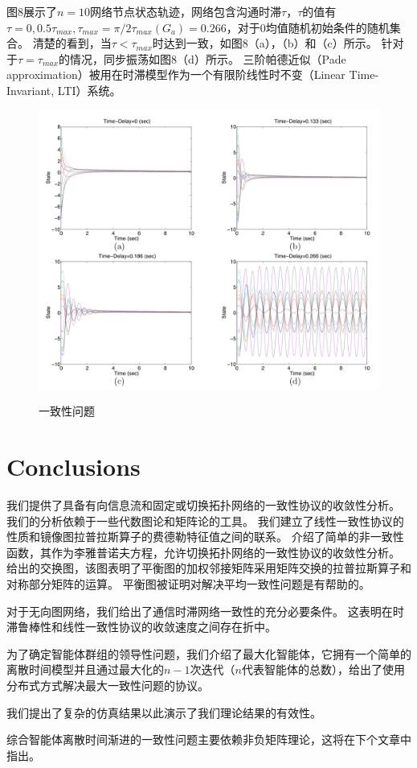 \documentclass{article}
\begin{document}
图8展示了$n=10$网络节点状态轨迹，网络包含沟通时滞$\tau$，$\tau$的值有$\tau=0, 0.5\tau_{max}, \tau_{max} = \pi / 2\tau_{max}(G_a) = 0.266$，对于0均值随机初始条件的随机集合。
清楚的看到，当$\tau < \tau_{max}$时达到一致，如图8（a），（b）和（c）所示。
针对于$\tau = \tau_{max}$的情况，同步振荡如图8（d）所示。
三阶帕德近似（Pade approximation）被用在时滞模型作为一个有限阶线性时不变（Linear Time-Invariant, LTI）系统。
\begin{figure}[htbp]
    \centering
    \includegraphics[width=14.5cm]{figures/Fig8-ConsensusProblem.jpeg}
    \label{ConsensusProblem}
    \caption{一致性问题}
\end{figure}


\section{Conclusions}
我们提供了具备有向信息流和固定或切换拓扑网络的一致性协议的收敛性分析。
我们的分析依赖于一些代数图论和矩阵论的工具。
我们建立了线性一致性协议的性质和镜像图拉普拉斯算子的费德勒特征值之间的联系。
介绍了简单的非一致性函数，其作为李雅普诺夫方程，允许切换拓扑网络的一致性协议的收敛性分析。
给出的交换图，该图表明了平衡图的加权邻接矩阵采用矩阵交换的拉普拉斯算子和对称部分矩阵的运算。
平衡图被证明对解决平均一致性问题是有帮助的。

对于无向图网络，我们给出了通信时滞网络一致性的充分必要条件。
这表明在时滞鲁棒性和线性一致性协议的收敛速度之间存在折中。

为了确定智能体群组的领导性问题，我们介绍了最大化智能体，它拥有一个简单的离散时间模型并且通过最大化的$n-1$次迭代（$n$代表智能体的总数），给出了使用分布式方式解决最大一致性问题的协议。

我们提出了复杂的仿真结果以此演示了我们理论结果的有效性。

综合智能体离散时间渐进的一致性问题主要依赖非负矩阵理论，这将在下个文章中指出。
\end{document}
